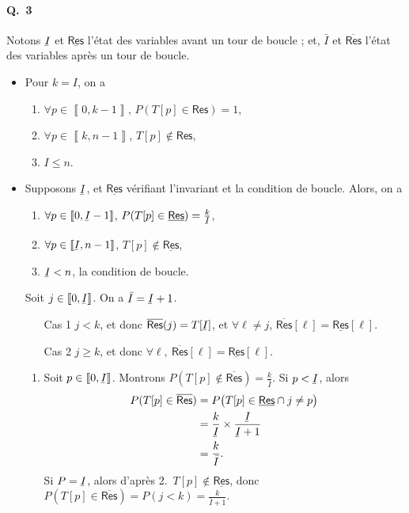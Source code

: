 \paragraph{Q.\ 3}
Notons $\ubar{I}$\/ et $\underline{\textsf{Res}}$\/ l'état des variables avant un tour de boucle ; et, $\bar{I}$\/ et $\overline{\textsf{Res}}$\/ l'état des variables après un tour de boucle.
\begin{itemize}
	\item Pour $k = I$, on a
		\begin{enumerate}
			\item $\forall p \in \left\llbracket 0,k-1 \right\rrbracket$, $P(T[p] \in \textsf{Res}) = 1$,
			\item $\forall p \in \left\llbracket k, n-1 \right\rrbracket$, $T[p] \not\in \textsf{Res}$,
			\item $I \le n$.
		\end{enumerate}
	\item Supposons $\ubar{I}$, et $\underline{\textsf{Res}}$\/ vérifiant l'invariant et la condition de boucle. Alors, on a
		\begin{enumerate}
			\item $\forall p \in \left\llbracket 0, \ubar{I} - 1 \right\rrbracket$, $P(T[p] \in \underline{\textsf{Res}}) = \frac{k}{\ubar{I}}$,
			\item $\forall p \in \left\llbracket \ubar{I}, n-1 \right\rrbracket$, $T[p] \not\in \underline{\textsf{Res}}$,
			\item $\ubar{I} < n$, la condition de boucle.
		\end{enumerate}
		Soit $j \in \left\llbracket 0, \ubar{I} \right\rrbracket$.
		On a $\bar{I} = \ubar{I} + 1$.
		\begin{itemize}
			\item[\sc Cas 1] $j < k$, et donc $\overline{\textsf{Res}}(j) = T[\ubar{I}]$, et $\forall \ell \neq j$, $\overline{\textsf{Res}}[\ell] = \underline{\textsf{Res}}[\ell]$.
			\item[\sc Cas 2] $j \ge  k$, et donc $\forall \ell,\:\overline{\textsf{Res}}[\ell] = \underline{\textsf{Res}}[\ell]$.
		\end{itemize}

		\begin{enumerate}
			\item Soit $p \in \left\llbracket 0, \ubar{I} \right\rrbracket $. Montrons $P(T[p] \not\in \overline{\textsf{Res}}) = \frac{k}{\bar{I}}$. Si $p < \ubar{I}$, alors
				\begin{align*}
					P(T[p] \in \overline{\textsf{Res}}) &= P\big(T[p] \in \underline{\textsf{Res}} \cap j \neq p\big) \\
					&= \frac{k}{\ubar{I}} \times \frac{\ubar{I}}{\ubar{I} + 1} \\
					&= \frac{k}{\bar{I}}.
				\end{align*}
				Si $P = \ubar{I}$, alors d'après 2.\ $T[p] \not\in \underline{\textsf{Res}}$, donc $P(T[p] \in \overline{\textsf{Res}}) = P(j < k) = \frac{k}{\bar{I} + 1}$.
		\end{enumerate}
\end{itemize}




